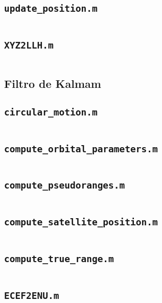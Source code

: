 \subsection{\texttt{update\_position.m}}
\inputminted[fontsize=\footnotesize]{matlab}{code_LS/update_position.m}

\subsection{\texttt{XYZ2LLH.m}}
\inputminted[fontsize=\footnotesize]{matlab}{code_LS/XYZ2LLH.m}

\subsection{Filtro de Kalmam}
\subsection{\texttt{circular\_motion.m}}
\inputminted[fontsize=\footnotesize]{matlab}{code_kalman/circular_motion.m}

\subsection{\texttt{compute\_orbital\_parameters.m}}
\inputminted[fontsize=\footnotesize]{matlab}{code_kalman/compute_orbital_parameters.m}

\subsection{\texttt{compute\_pseudoranges.m}}
\inputminted[fontsize=\footnotesize]{matlab}{code_kalman/compute_pseudoranges.m}

\subsection{\texttt{compute\_satellite\_position.m}}
\inputminted[fontsize=\footnotesize]{matlab}{code_kalman/compute_satellite_position.m}

\subsection{\texttt{compute\_true\_range.m}}
\inputminted[fontsize=\footnotesize]{matlab}{code_kalman/compute_true_range.m}

\subsection{\texttt{ECEF2ENU.m}}
\inputminted[fontsize=\footnotesize]{matlab}{code_kalman/ECEF2ENU.m}

